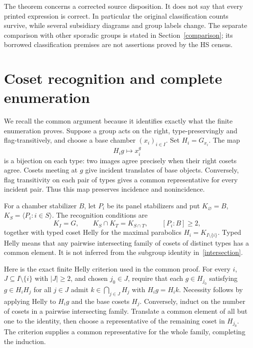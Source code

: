 The theorem concerns a corrected source disposition. It does not say
that every printed expression is correct. In particular the original
classification counts survive, while several subsidiary diagrams and
group labels change. The separate comparison with other sporadic groups
is stated in Section~\ref{comparison}; its borrowed classification
premises are not assertions proved by the HS census.

\section{Coset recognition and complete enumeration}
We recall the common argument because it identifies exactly what the
finite enumeration proves. Suppose a group acts on the right,
type-preservingly and flag-transitively, and choose a base chamber
$(x_i)_{i\in I}$. Set $H_i=G_{x_i}$. The map
\[
             H_i g\longmapsto x_i^g
\]
is a bijection on each type: two images agree precisely when their right
cosets agree. Cosets meeting at $g$ give incident translates of base
objects. Conversely, flag transitivity on each pair of types gives a
common representative for every incident pair. Thus this map preserves
incidence and nonincidence.

For a chamber stabilizer $B$, let $P_i$ be its panel stabilizers and put
$K_\varnothing=B$, $K_S=\langle P_i:i\in S\rangle$. The recognition
conditions are
\begin{equation}\label{intersection}
 K_I=G,\qquad K_S\cap K_T=K_{S\cap T},\qquad [P_i:B]\geq2,
\end{equation}
together with typed coset Helly for the maximal parabolics
$H_i=K_{I\setminus\{i\}}$. Typed Helly means that any pairwise
intersecting family of cosets of distinct types has a common element.
It is not inferred from the subgroup identity in~\eqref{intersection}.

Here is the exact finite Helly criterion used in the common proof.
For every $i$, $J\subseteq I\setminus\{i\}$ with $|J|\geq2$, and
chosen $j_0\in J$, require that each $g\in H_{j_0}$ satisfying
$g\in H_iH_j$ for all $j\in J$ admit
$k\in\bigcap_{j\in J}H_j$ with $H_i g=H_i k$.
Necessity follows by applying Helly to $H_i g$ and the base cosets
$H_j$. Conversely, induct on the number of cosets in a pairwise
intersecting family. Translate a common element of all but one to the
identity, then choose a representative of the remaining coset in
$H_{j_0}$. The criterion supplies a common representative for the whole
family, completing the induction.

